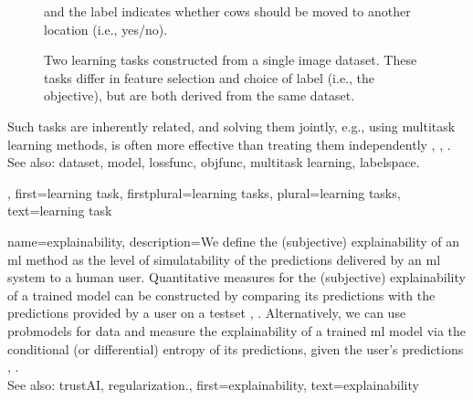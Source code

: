 {{\begin{figure}[H]
\begin{minipage}[t]{0.45\textwidth}
        			and the \gls{label} indicates whether cows should be moved to another location (i.e., yes/no).
			\end{minipage}
			\caption{Two learning tasks constructed from a single image \gls{dataset}. 
			These tasks differ in \gls{feature} selection and choice of \gls{label} (i.e., the objective), 
			but are both derived from the same \gls{dataset}.}
			\label{fig:learning_tasks_cows_dict}
		\end{figure}
		Such tasks are inherently related, and solving them jointly, e.g., using \gls{multitask learning} 
		methods, is often more effective than treating them independently 
		\cite{Caruana:1997wk}, \cite{JungGaphLassoSPL}, \cite{CSGraphSelJournal}.
	 			\\ 
		See also: \gls{dataset}, \gls{model}, \gls{lossfunc}, \gls{objfunc}, \gls{multitask learning}, \gls{labelspace}.},
	first={learning task},
	firstplural={learning tasks},
	plural={learning tasks}, 
	text={learning task}
}

{name={explainability},
	description={We define the (subjective) explainability of an \gls{ml} method 
		as the level of simulatability \cite{Colin:2022aa} of the \glspl{prediction} 
		delivered by an \gls{ml} system to a human user. Quantitative measures for the 
		(subjective) explainability of a trained \gls{model} can be constructed by 
		comparing its \glspl{prediction} with the \glspl{prediction} provided by a user 
		on a \gls{testset} \cite{Colin:2022aa}, \cite{Zhang:2024aa}. Alternatively, we can use 
		\glspl{probmodel} for \gls{data} and measure the explainability of a trained \gls{ml} 
		\gls{model} via the conditional (or differential) \gls{entropy} of its \glspl{prediction}, given the 
		user's \glspl{prediction} \cite{JunXML2020}, \cite{Chen2018}.
						\\ 
		See also: \gls{trustAI}, \gls{regularization}.},
	first={explainability},
	text={explainability}
}

